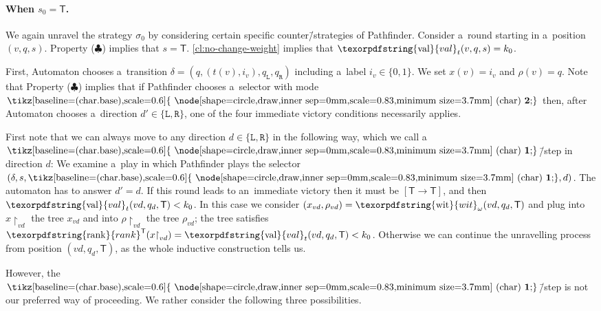 \documentclass[11pt,a4paper]{amsart}
\theoremstyle{plain}
\theoremstyle{definition}
\theoremstyle{defC}
\theoremstyle{thmC}
\theoremstyle{plain}
\numberwithin{equation}{section}
\numberwithin{equation}{section}
\numberwithin{figure}{section}
\newcommand{\ident}[1]{\ensuremath{\texorpdfstring{\mathrm{\mathnm{#1}}}{#1}}\xspace}
\newcommand{\dL}{\mathtt{{\scriptstyle L}}}
\newcommand{\dR}{\mathtt{{\scriptstyle R}}}
\newcommand{\mathnm}[1]{#1}
\newcommand{\restr}{{\upharpoonright}}
\newcommand{\val}{\ident{val}}
\newcommand{\sT}{\mathsf{T}}
\newcommand{\rankT}{\ident{rank}^\sT}
\newcommand*\circled[1]{\tikz[baseline=(char.base),scale=0.6]{
            \node[shape=circle,draw,inner sep=0mm,scale=0.83,minimum size=3.7mm] (char) {\textbf{#1}};}}
\newcommand{\fb}{\mathbf{\text{\circled{2}}}}
\newcommand{\fg}{\mathbf{\text{\circled{1}}}}
\newcommand{\imwin}[2]{[#1\to #2]}
\newcommand{\wit}{\ident{wit}_\omega}
\begin{document}
\paragraph*{When $s_0=\sT$.}

We again unravel the strategy $\sigma_0$ by considering certain specific counter\=/strategies of Pathfinder.
Consider a~round starting in a~position $(v,q,s)$.
Property ($\clubsuit$) implies that $s=\sT$.
\cref{cl:no-change-weight} implies that $\val_t(v,q,s)=k_0$.

First, Automaton chooses a~transition $\delta=(q,(t(v),i_v),q_\dL,q_\dR)$ including a~label $i_v\in\{0,1\}$.
We set $x(v)=i_v$ and $\rho(v)=q$.
Note that Property ($\clubsuit$) implies that if Pathfinder chooses a~selector with mode $\fb$
then, after Automaton chooses a~direction $d'\in\{\dL,\dR\}$, one of the four immediate victory conditions necessarily applies.

First note that we can always move to any direction $d\in\{\dL,\dR\}$ in the following way, which we call a~$\fg$\=/step in direction $d$:
We examine a~play in which Pathfinder plays the selector $(\delta,s,\fg,d)$.
The automaton has to answer $d'=d$.
If this round leads to an~immediate victory then it must be $\imwin{\sT}{\sT}$, and then $\val_t(vd,q_d,\sT)<k_0$.
In this case we consider $(x_{vd},\rho_{vd})=\wit(vd,q_d,\sT)$ and plug into $x\restr_{vd}$ the tree $x_{vd}$ and into $\rho\restr_{vd}$ the tree $\rho_{vd}$;
the tree satisfies $\rankT(x\restr_{vd})=\val_t(vd,q_{d},\sT)<k_0$.
Otherwise we can continue the unravelling process from position $(vd,q_d,\sT)$, as the whole inductive construction tells us.

However, the $\fg$\=/step is not our preferred way of proceeding.
We rather consider the following three possibilities.
\end{document}
